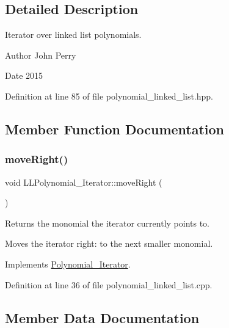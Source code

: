 \subsection{Detailed Description}
Iterator over linked list polynomials. 

\begin{DoxyAuthor}{Author}
John Perry 
\end{DoxyAuthor}
\begin{DoxyDate}{Date}
2015 
\end{DoxyDate}


Definition at line 85 of file polynomial\+\_\+linked\+\_\+list.\+hpp.



\subsection{Member Function Documentation}
\mbox{\label{class_l_l_polynomial___iterator_a940e0d03494ae2f5aefaf96dd8c0c49f}} 
\subsubsection{\texorpdfstring{move\+Right()}{moveRight()}}
{\footnotesize\ttfamily void L\+L\+Polynomial\+\_\+\+Iterator\+::move\+Right (\begin{DoxyParamCaption}{ }\end{DoxyParamCaption})\hspace{0.3cm}{\ttfamily [virtual]}}



Returns the monomial the iterator currently points to. 

Moves the iterator right\+: to the next smaller monomial. 

Implements \hyperlink{class_polynomial___iterator_ad7adb26df3077c6c7dec39e066436ce9}{Polynomial\+\_\+\+Iterator}.



Definition at line 36 of file polynomial\+\_\+linked\+\_\+list.\+cpp.



\subsection{Member Data Documentation}
\mbox{\label{class_l_l_polynomial___iterator_a50151664e42e30b845a0a0d11577cfff}} 
